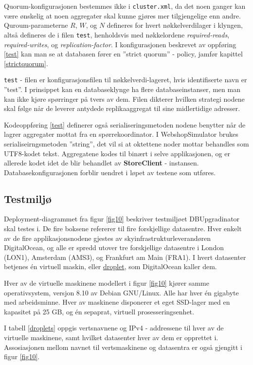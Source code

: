 

Quorum-konfigurasjonen bestemmes ikke i \texttt{cluster.xml}, da det noen ganger kan være ønskelig at noen aggregater skal kunne gjøres mer tilgjengelige enn andre. Quroum-parameterne \(R\), \(W\), og \(N\) defineres for hvert nøkkelverdi\-lager i klyngen, altså defineres de i filen \texttt{test}, henholdsvis med nøkkelordene \emph{required-reads}, \emph{required-writes}, og \emph{replication-factor}. I konfigurasjonen beskrevet av oppføring \ref{test} kan man se at databasen fører en ''strict quorum'' - policy, jamfør kapittel \ref{strictquorum}.

\texttt{test} - filen er konfigurasjonsfilen til nøkkelverdi-lageret, hvis identifiserte navn er ''test''.  I prinsippet kan en databaseklynge ha flere databaseinstanser, men man kan ikke kjøre spørringer på tvers av dem. Filen dikterer hvilken strategi nodene skal følge når de leverer antydede replika\-aggregat til sine midlertidige adresser.

Kodeoppføring \ref{test} definerer også serialiseringsmetoden nodene benytter når de lagrer aggregater mottat fra en spørrekoordinator. I WebshopSimulator brukes serialiseirngs\-metoden ''string'', det vil si at oktettene noder mottar behandles som UTF8-kodet tekst. Aggregatene kodes til binært i selve applikasjonen, og er allerede kodet idet de blir behandlet av \textbf{StoreClient} - instansen. Databasekonfigurasjonen forblir uendret i løpet av testene som utføres.

\subsection{Testmiljø}

Deployment-diagrammet fra figur \ref{fig10} beskriver testmiljøet DBUpgradinator skal testes i. De fire boksene refererer til fire forskjellige datasentre. Hver enkelt av de fire applikasjonsnodene gjestes av skyinfrastrukturleverandøren DigitalOcean, og alle er spredd utover tre forskjellige datasentre i London (LON1), Amsterdam (AMS3), og Frankfurt am Main (FRA1). I hvert datasenter betjenes én virtuell maskin, eller \underline{droplet}, som DigitalOcean kaller dem.

Hver av de virtuelle maskinene modellert i figur \ref{fig10} kjører samme operativsystem, versjon 8.10 av Debian GNU/Linux. Alle har hver én gigabyte med arbeidsminne. Hver av maskinene disponerer et eget SSD-lager med en kapasitet på 25 GB, og én sepaprat, virtuell prosesseringsenhet.



I tabell \ref{droplets} oppgis vertsnavnene og IPv4 - addressene til hver av de virtuelle maskinene, samt hvilket datasenter hver av dem er opprettet i. Assosiasjonen mellom navnet til vertsmaskinene og datasentra er også gjengitt i figur \ref{fig10}.

